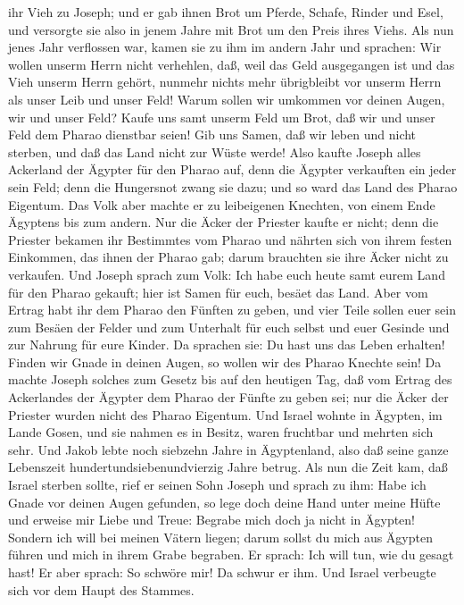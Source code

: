 ihr Vieh zu Joseph; und er gab ihnen Brot um Pferde, Schafe, Rinder und
Esel, und versorgte sie also in jenem Jahre mit Brot um den Preis ihres
Viehs.  Als nun jenes Jahr verflossen war, kamen sie zu
ihm im andern Jahr und sprachen: Wir wollen unserm Herrn nicht
verhehlen, daß, weil das Geld ausgegangen ist und das Vieh unserm Herrn
gehört, nunmehr nichts mehr übrigbleibt vor unserm Herrn als unser Leib
und unser Feld!  Warum sollen wir umkommen vor deinen
Augen, wir und unser Feld? Kaufe uns samt unserm Feld um Brot, daß wir
und unser Feld dem Pharao dienstbar seien! Gib uns Samen, daß wir leben
und nicht sterben, und daß das Land nicht zur Wüste werde!
 Also kaufte Joseph alles Ackerland der Ägypter für den
Pharao auf, denn die Ägypter verkauften ein jeder sein Feld; denn die
Hungersnot zwang sie dazu; und so ward das Land des Pharao Eigentum.
 Das Volk aber machte er zu leibeigenen Knechten, von
einem Ende Ägyptens bis zum andern.  Nur die Äcker der
Priester kaufte er nicht; denn die Priester bekamen ihr Bestimmtes vom
Pharao und nährten sich von ihrem festen Einkommen, das ihnen der Pharao
gab; darum brauchten sie ihre Äcker nicht zu verkaufen. 
Und Joseph sprach zum Volk: Ich habe euch heute samt eurem Land für den
Pharao gekauft; hier ist Samen für euch, besäet das Land.
 Aber vom Ertrag habt ihr dem Pharao den Fünften zu
geben, und vier Teile sollen euer sein zum Besäen der Felder und zum
Unterhalt für euch selbst und euer Gesinde und zur Nahrung für eure
Kinder.  Da sprachen sie: Du hast uns das Leben erhalten!
Finden wir Gnade in deinen Augen, so wollen wir des Pharao Knechte sein!
 Da machte Joseph solches zum Gesetz bis auf den heutigen
Tag, daß vom Ertrag des Ackerlandes der Ägypter dem Pharao der Fünfte zu
geben sei; nur die Äcker der Priester wurden nicht des Pharao Eigentum.
 Und Israel wohnte in Ägypten, im Lande Gosen, und sie
nahmen es in Besitz, waren fruchtbar und mehrten sich sehr.
 Und Jakob lebte noch siebzehn Jahre in Ägyptenland, also
daß seine ganze Lebenszeit hundertundsiebenundvierzig Jahre betrug.
 Als nun die Zeit kam, daß Israel sterben sollte, rief er
seinen Sohn Joseph und sprach zu ihm: Habe ich Gnade vor deinen Augen
gefunden, so lege doch deine Hand unter meine Hüfte und erweise mir
Liebe und Treue: Begrabe mich doch ja nicht in Ägypten! 
Sondern ich will bei meinen Vätern liegen; darum sollst du mich aus
Ägypten führen und mich in ihrem Grabe begraben. Er sprach: Ich will
tun, wie du gesagt hast!  Er aber sprach: So schwöre mir!
Da schwur er ihm. Und Israel verbeugte sich vor dem Haupt des Stammes.

